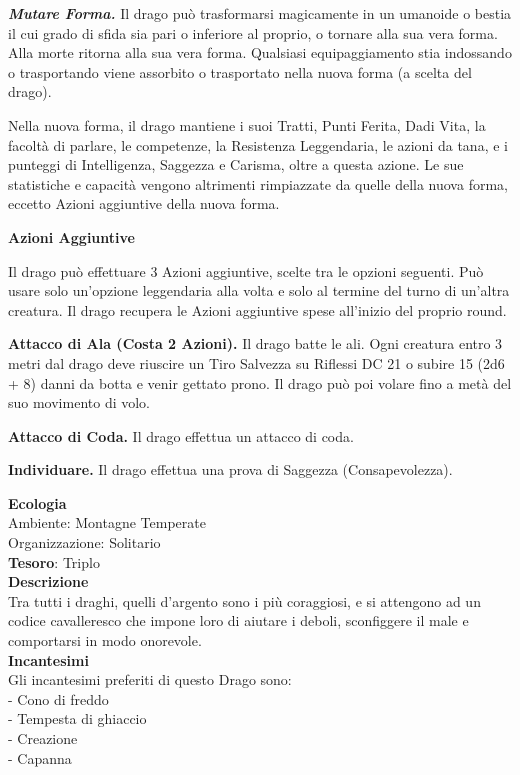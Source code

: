 \begin{multicols}{2}
\textit{\textbf{Mutare Forma.}} Il drago può trasformarsi magicamente in un umanoide o bestia il cui grado di sfida sia pari o inferiore al proprio, o tornare alla sua vera forma. Alla morte ritorna alla sua vera forma. Qualsiasi equipaggiamento stia indossando o trasportando viene assorbito o trasportato nella nuova forma (a scelta del drago).

Nella nuova forma, il drago mantiene i suoi Tratti, Punti Ferita, Dadi Vita, la facoltà di parlare, le competenze, la Resistenza Leggendaria, le azioni da tana, e i punteggi di Intelligenza, Saggezza e Carisma, oltre a questa azione. Le sue statistiche e capacità vengono altrimenti rimpiazzate da quelle della nuova forma, eccetto Azioni aggiuntive della nuova forma.

\textbf{Azioni Aggiuntive}

Il drago può effettuare 3 Azioni aggiuntive, scelte tra le opzioni seguenti. Può usare solo un'opzione leggendaria alla volta e solo al termine del turno di un'altra creatura. Il drago recupera le Azioni aggiuntive spese all'inizio del proprio round.

\textbf{Attacco di Ala (Costa 2 Azioni).} Il drago batte le ali. Ogni creatura entro 3 metri dal drago deve riuscire un Tiro Salvezza su Riflessi DC 21 o subire 15 (2d6 + 8) danni da botta e venir gettato prono. Il drago può poi volare fino a metà del suo movimento di volo.

\textbf{Attacco di Coda.} Il drago effettua un attacco di coda.

\textbf{Individuare.} Il drago effettua una prova di Saggezza (Consapevolezza).

\textbf{Ecologia}\\
Ambiente: Montagne Temperate\\
Organizzazione: Solitario\\
\textbf{Tesoro}: Triplo\\
\textbf{Descrizione}\\
Tra tutti i draghi, quelli d'argento sono i più coraggiosi, e si attengono ad un codice cavalleresco che impone loro di aiutare i deboli, sconfiggere il male e comportarsi in modo onorevole.\\
\textbf{Incantesimi}\\
Gli incantesimi preferiti di questo Drago sono:\\
- Cono di freddo\\
- Tempesta di ghiaccio\\
- Creazione\\
- Capanna


\end{multicols}
